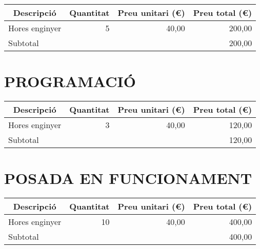 \begin{table}[H]
  \begin{center}
    \begin{tabularx} {\textwidth} {|X|r|r|r|} \hline
  \multicolumn{1}{|c|}{Descripció} &  \multicolumn{1}{c|}{Quantitat} & \multicolumn{1}{c|}{Preu unitari (€)} &  \multicolumn{1}{c|}{Preu total (€)}\\ \hline \hline
    Hores enginyer & 5    & 40,00 & 200,00 \\ \hline \hline
    \multicolumn{3}{|l}{Subtotal} & 200,00 \\\hline

    \end{tabularx}%
  \end{center}
  \label{tab:addlabel}%
\end{table}%

\section{\uppercase{Programació}}

\begin{table}[H]
  \begin{center}
    \begin{tabularx} {\textwidth} {|X|r|r|r|} \hline
  \multicolumn{1}{|c|}{Descripció} &  \multicolumn{1}{c|}{Quantitat} & \multicolumn{1}{c|}{Preu unitari (€)} &  \multicolumn{1}{c|}{Preu total (€)}\\ \hline \hline
    Hores enginyer & 3    & 40,00 & 120,00 \\ \hline \hline
    \multicolumn{3}{|l}{Subtotal} & 120,00 \\\hline

    \end{tabularx}%
  \end{center}
  \label{tab:addlabel}%
\end{table}%


\section{\uppercase{Posada en funcionament}}

\begin{table}[H]
  \begin{center}
    \begin{tabularx} {\textwidth} {|X|r|r|r|} \hline
  \multicolumn{1}{|c|}{Descripció} &  \multicolumn{1}{c|}{Quantitat} & \multicolumn{1}{c|}{Preu unitari (€)} &  \multicolumn{1}{c|}{Preu total (€)}\\ \hline \hline
    Hores enginyer & 10    & 40,00 & 400,00 \\ \hline \hline
    \multicolumn{3}{|l}{Subtotal} & 400,00 \\\hline

    \end{tabularx}%
  \end{center}
  \label{tab:addlabel}%
\end{table}%

